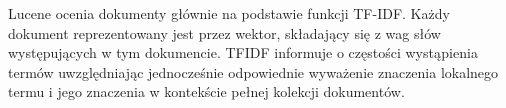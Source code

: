 Lucene ocenia dokumenty głównie na podstawie funkcji TF-IDF. Każdy dokument reprezentowany jest przez wektor, składający się z wag słów występujących w tym dokumencie. TFIDF informuje o częstości wystąpienia termów uwzględniając jednocześnie odpowiednie wyważenie znaczenia lokalnego termu i jego znaczenia w kontekście pełnej kolekcji dokumentów.


